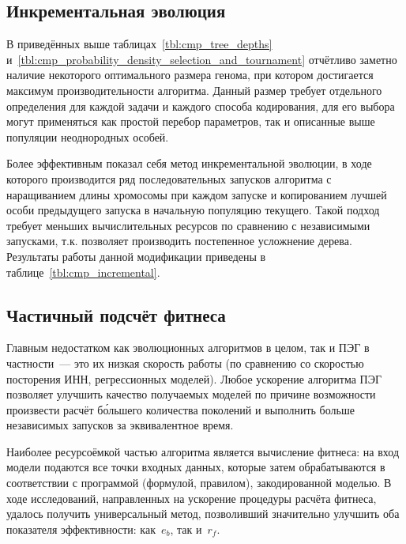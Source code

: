 


\subsection{Инкрементальная эволюция}

В приведённых выше таблицах~\ref{tbl:cmp_tree_depths} и~\ref{tbl:cmp_probability_density_selection_and_tournament} отчётливо заметно наличие некоторого оптимального размера генома, при котором достигается максимум производительности алгоритма. Данный размер требует отдельного определения для каждой задачи и каждого способа кодирования, для его выбора могут применяться как простой перебор параметров, так и описанные выше популяции неоднородных особей.

Более эффективным показал себя метод инкрементальной эволюции, в ходе которого производится ряд последовательных запусков алгоритма с наращиванием длины хромосомы при каждом запуске и копированием лучшей особи предыдущего запуска в начальную популяцию текущего. Такой подход требует меньших вычислительных ресурсов по сравнению с независимыми запусками, т.к. позволяет производить постепенное усложнение дерева. Результаты работы данной модификации приведены в таблице~\ref{tbl:cmp_incremental}.

%


\subsection{Частичный подсчёт фитнеса}
\cite{ferreira:2001:wsc6Aa}
Главным недостатком как эволюционных алгоритмов в целом, так и ПЭГ в частности~--- это их низкая скорость работы (по сравнению со скоростью посторения ИНН, регрессионных моделей). Любое ускорение алгоритма ПЭГ позволяет улучшить качество получаемых моделей по причине возможности произвести расчёт б\'{о}льшего количества поколений и выполнить больше независимых запусков за эквивалентное время.

Наиболее ресурсоёмкой частью алгоритма является вычисление фитнеса: на вход модели подаются все точки входных данных, которые затем обрабатываются в соответствии с программой (формулой, правилом), закодированной моделью. В ходе исследований, направленных на ускорение процедуры расчёта фитнеса, удалось получить универсальный метод, позволивший значительно улучшить оба показателя эффективности: как~$e_{b}$, так и~$r_{f}$.


